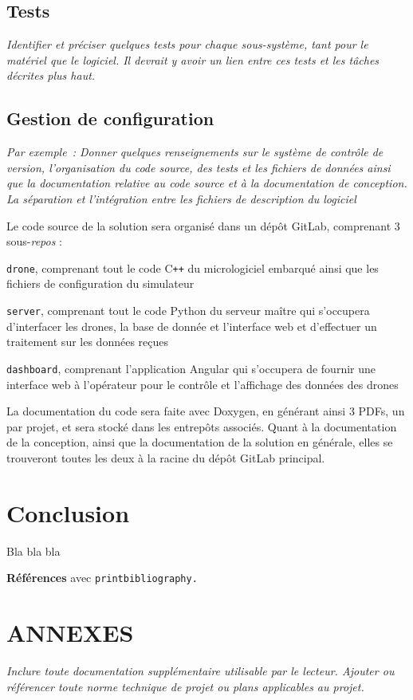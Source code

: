 \documentclass{mistcoursedoc}
\begin{document}
\subsection{Tests}

\textit{Identifier et préciser quelques tests pour chaque sous-système, tant pour le matériel que le logiciel.  Il devrait y avoir un lien entre ces tests et les tâches décrites plus haut.}

\subsection{Gestion de configuration}

\textit{Par exemple : Donner quelques renseignements sur le système de contrôle de version, l’organisation du code source, des tests et les fichiers de données ainsi que la documentation relative au code source et à la documentation de conception.  La séparation et l’intégration entre les fichiers de description du logiciel}

Le code source de la solution sera organisé dans un dépôt GitLab, comprenant 3 sous-\textit{repos} :
\begin{ítemize}
  \item \texttt{drone}, comprenant tout le code C\texttt{++} du micrologiciel embarqué ainsi que les fichiers de configuration du simulateur
  \item \texttt{server}, comprenant tout le code Python du serveur maître qui s'occupera d'interfacer les drones, la base de donnée et l'interface web et d'effectuer un traitement sur les données reçues
  \item \texttt{dashboard}, comprenant l'application Angular qui s'occupera de fournir une interface web à l'opérateur pour le contrôle et l'affichage des données des drones
\end{ítemize}

La documentation du code sera faite avec Doxygen, en générant ainsi 3 PDFs, un par projet, et sera stocké dans les entrepôts associés. Quant à la documentation de la conception, ainsi que la documentation de la solution en générale, elles se trouveront toutes les deux à la racine du dépôt GitLab principal.

\section*{Conclusion}

Bla bla bla

\textbf{Références} avec \texttt{printbibliography.}


\section*{ANNEXES}

\textit{Inclure toute documentation supplémentaire utilisable par le lecteur. Ajouter ou référencer toute norme technique de projet ou plans applicables au projet.}
\end{document}
